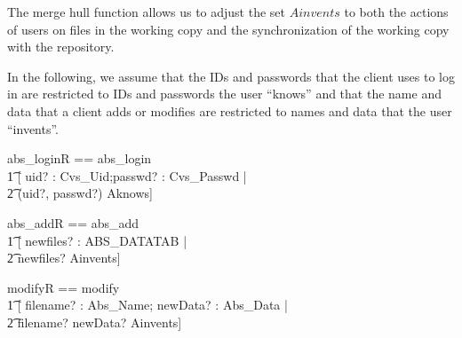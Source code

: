 The merge hull function allows us to adjust the set $Ainvents$ to both the
actions of users on files in the working copy and the synchronization of the
working copy with the repository. 

In the following, we assume that the IDs and passwords that the client uses to
log in are restricted to IDs and passwords the user ``knows'' and that the name
and data that a client adds or modifies are restricted to names and data that
the user ``invents''.
\begin{zed}
%
%
  abs\_loginR == abs\_login \land \\
  \t1 [ \< uid? : Cvs\_Uid;passwd? : Cvs\_Passwd | \\
  \t2 (uid?, passwd?) \in Aknows] \> \\
\end{zed}
%
%
\begin{zed}
  abs\_addR == abs\_add \land \\
  \t1 [ newfiles? : ABS\_DATATAB | \\
  \t2 newfiles? \subseteq Ainvents] \\
\end{zed}
%
%
\begin{zed}
  modifyR == modify \land \\
  \t1 [ \< filename? : Abs\_Name; newData? : Abs\_Data | \\ 
  \t2 filename? \mapsto newData? \in Ainvents] \> \\
\end{zed}

